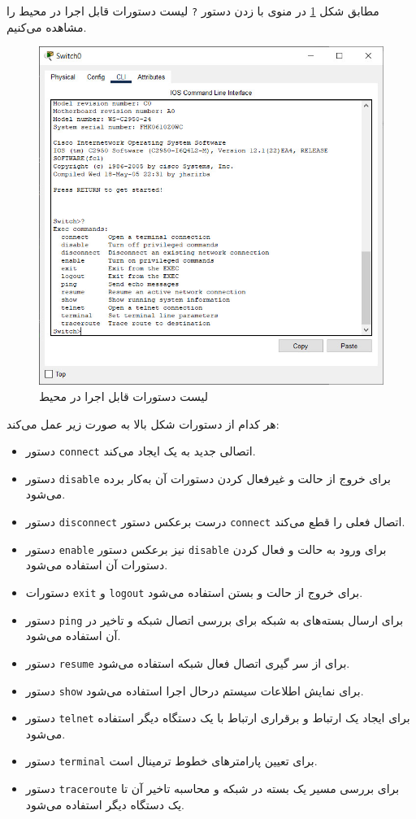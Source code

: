 \documentclass{article}
\newcommand{\code}[1]{\colorbox{codegray}{\texttt{#1}}}
\begin{document}
مطابق شکل \ref{fig:user-excec-commands} در منوی  با زدن دستور \code{?} لیست دستورات قابل اجرا در محیط  را مشاهده می‌کنیم.
\begin{figure}[h!]
	\centering
	\includegraphics[width=0.6\columnwidth]{figs/user-excec-commands.jpg}
	\caption{لیست دستورات قابل اجرا در محیط }
	\label{fig:user-excec-commands}
\end{figure}

هر کدام از دستورات شکل بالا به صورت زیر عمل می‌کند:
\begin{itemize}
	\item 
	دستور \code{connect} اتصالی جدید به یک  ایجاد می‌کند.
	\item 
	دستور \code{disable} برای خروج از حالت  و غیرفعال کردن دستورات آن به‌کار برده می‌شود.
	\item 
	دستور \code{disconnect} درست برعکس دستور \code{connect} اتصال فعلی را قطع می‌کند.
	\item 
	دستور \code{enable} نیز برعکس دستور \code{disable} برای ورود به حالت  و فعال کردن دستورات آن استفاده می‌شود.
	\item 
	دستورات \code{exit}  و \code{logout} برای خروج از حالت  و بستن  استفاده می‌شود.
	\item 
	دستور \code{ping} برای ارسال بسته‌های  به شبکه برای بررسی اتصال شبکه و تاخیر در آن استفاده می‌شود.
	\item 
	دستور \code{resume} برای از سر گیری اتصال فعال شبکه استفاده می‌شود.
	\item 
	دستور \code{show} برای نمایش اطلاعات سیستم درحال اجرا استفاده می‌شود.
	\item 
	دستور \code{telnet} برای ایجاد یک ارتباط  و برقراری ارتباط با یک دستگاه دیگر استفاده می‌شود.
	\item 
	دستور \code{terminal} برای تعیین پارامترهای خطوط ترمینال است.
	\item 
	دستور \code{traceroute} برای بررسی مسیر یک بسته در شبکه و محاسبه تاخیر آن تا یک دستگاه دیگر استفاده می‌شود.
\end{itemize}
\end{document}
